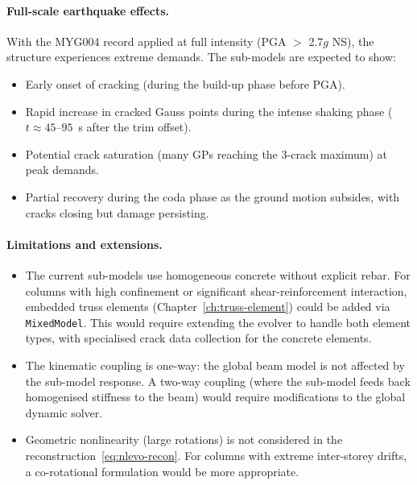 \paragraph{Full-scale earthquake effects.}
With the MYG004 record applied at full intensity (PGA $>$ 2.7$g$ NS),
the structure experiences extreme demands.  The sub-models are
expected to show:
\begin{itemize}
  \item Early onset of cracking (during the build-up phase before PGA).
  \item Rapid increase in cracked Gauss points during the intense
        shaking phase ($t \approx 45$--$95$~s after the trim offset).
  \item Potential crack saturation (many GPs reaching the 3-crack
        maximum) at peak demands.
  \item Partial recovery during the coda phase as the ground motion
        subsides, with cracks closing but damage persisting.
\end{itemize}

\paragraph{Limitations and extensions.}
\begin{itemize}
  \item The current sub-models use homogeneous concrete without
        explicit rebar.  For columns with high confinement or
        significant shear-reinforcement interaction, embedded truss
        elements (Chapter~\ref{ch:truss-element}) could be added via
        \texttt{MixedModel}.  This would require extending the evolver
        to handle both element types, with specialised crack data
        collection for the concrete elements.
  \item The kinematic coupling is one-way: the global beam model is
        not affected by the sub-model response.  A two-way coupling
        (where the sub-model feeds back homogenised stiffness to the
        beam) would require modifications to the global dynamic solver.
  \item Geometric nonlinearity (large rotations) is not considered in
        the reconstruction~\eqref{eq:nlevo-recon}.  For columns with
        extreme inter-storey drifts, a co-rotational formulation would
        be more appropriate.
\end{itemize}
